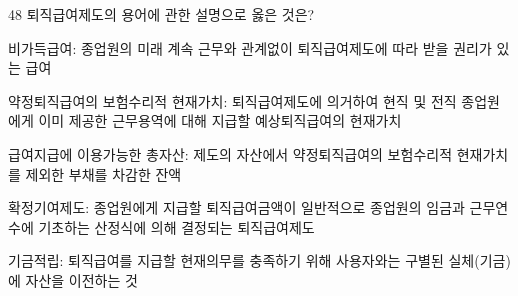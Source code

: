 \begin{question}{48}
퇴직급여제도의 용어에 관한 설명으로 옳은 것은?
\begin{choices}
  \item 비가득급여: 종업원의 미래 계속 근무와 관계없이 퇴직급여제도에 따라 받을 권리가 있는 급여
  \item 약정퇴직급여의 보험수리적 현재가치: 퇴직급여제도에 의거하여 현직 및 전직 종업원에게 이미 제공한 근무용역에 대해 지급할 예상퇴직급여의 현재가치
  \item 급여지급에 이용가능한 총자산: 제도의 자산에서 약정퇴직급여의 보험수리적 현재가치를 제외한 부채를 차감한 잔액
  \item 확정기여제도: 종업원에게 지급할 퇴직급여금액이 일반적으로 종업원의 임금과 근무연수에 기초하는 산정식에 의해 결정되는 퇴직급여제도
  \item 기금적립: 퇴직급여를 지급할 현재의무를 충족하기 위해 사용자와는 구별된 실체(기금)에 자산을 이전하는 것
\end{choices}
\end{question}
